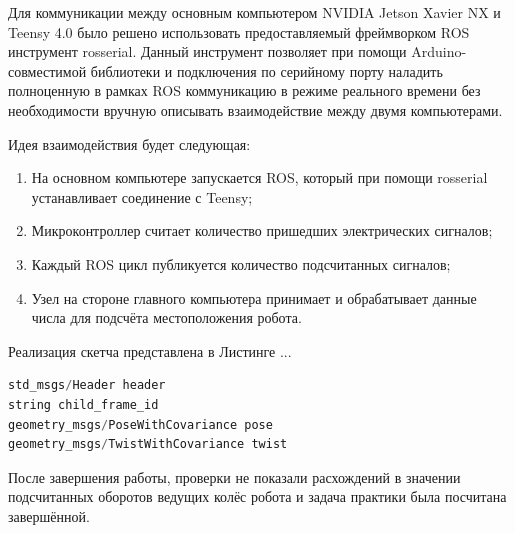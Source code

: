 \documentclass[12pt,a4paper]{scrartcl}
\begin{document}
			Для коммуникации между основным компьютером NVIDIA Jetson Xavier NX и Teensy 4.0 было решено использовать предоставляемый фреймворком ROS инструмент rosserial. Данный инструмент позволяет при помощи Arduino-совместимой библиотеки и подключения по серийному порту наладить полноценную в рамках ROS коммуникацию в режиме реального времени без необходимости вручную описывать взаимодействие между двумя компьютерами.
			
			Идея взаимодействия будет следующая:
			\begin{enumerate}
				\item На основном компьютере запускается ROS, который при помощи rosserial устанавливает соединение с Teensy;
				\item Микроконтроллер считает количество пришедших электрических сигналов;
				\item Каждый ROS цикл публикуется количество подсчитанных сигналов;
				\item Узел на стороне главного компьютера принимает и обрабатывает данные числа для подсчёта местоположения робота.
			\end{enumerate}
			
			Реализация скетча представлена в Листинге ...
			
			\begin{lstlisting}[language=C,caption={Формат сообщения nav\_msgs/Odometry},label={lst:OdometryMsg}]
std_msgs/Header header
string child_frame_id
geometry_msgs/PoseWithCovariance pose
geometry_msgs/TwistWithCovariance twist
			\end{lstlisting}	
			
			После завершения работы, проверки не показали расхождений в значении подсчитанных оборотов ведущих колёс робота и задача практики была посчитана завершённой.
			
		
\end{document}
